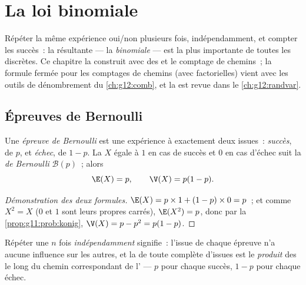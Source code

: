 \chapter{La loi binomiale}\label{ch:g11:binom}

Répéter la même expérience oui/non plusieurs fois, indépendamment, et
compter les succès~: la  résultante --- la \emph{binomiale} --- est la
plus importante de toutes les  discrètes. Ce chapitre la construit
avec des  et le comptage de chemins~; la formule fermée pour les
comptages de chemins (avec factorielles) vient avec les outils de
dénombrement du \cref{ch:g12:comb}, et la  est revue dans le
\cref{ch:g12:randvar}.

\section{Épreuves de Bernoulli}

\begin{definition}\label{def:g11:binom:bernoulli}
Une \emph{épreuve de Bernoulli} est une
expérience à exactement deux issues~: \emph{succès}, de  $p$,
et \emph{échec}, de  $1 - p$. La  $X$ égale
à $1$ en cas de succès et $0$ en cas d'échec suit la \emph{ de
Bernoulli} $\mathcal B(p)$~; alors
\[
\E(X) = p,
\qquad
\V(X) = p(1 - p).
\]
\end{definition}

\begin{proof}[Démonstration des deux formules]
$\E(X) = p \times 1 + (1-p) \times 0 = p$~; et comme $X^2 = X$ ($0$ et
$1$ sont leurs propres carrés), $\E(X^2) = p$, donc par la
\cref{prop:g11:prob:konig}, $\V(X) = p - p^2 = p(1-p)$.
\end{proof}

\begin{definition}\label{def:g11:binom:repeated}
Répéter une  $n$ fois \emph{indépendamment} signifie~:
l'issue de chaque épreuve n'a aucune influence sur les autres, et la
 de toute  complète d'issues est le \emph{produit} des
 le long du chemin correspondant de l' --- $p$ pour
chaque succès, $1 - p$ pour chaque échec.
\end{definition}

